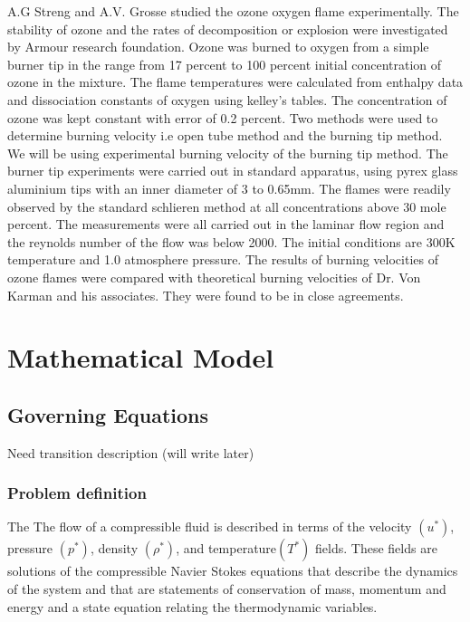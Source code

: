 \documentclass[10pt]{ubthesis}
\begin{document}
\bigskip
\noindent A.G Streng and A.V. Grosse \cite{Streng} studied the ozone oxygen flame experimentally. The stability of ozone and the rates of decomposition or explosion were investigated by Armour research foundation. Ozone was burned to oxygen from a simple burner tip in the range from 17 percent to 100 percent initial concentration of ozone in the mixture. The flame temperatures were calculated from enthalpy data and dissociation constants of oxygen using kelley's tables. The concentration of ozone was kept constant with error of   0.2 percent. Two methods were used to determine burning velocity i.e open tube method and the burning tip method. We will be using experimental burning velocity of the burning tip method. The burner tip experiments were carried out in standard apparatus, using pyrex glass aluminium tips with an inner diameter of 3 to 0.65mm. The flames were readily observed by the standard schlieren method at all concentrations above 30 mole percent. The measurements were all carried out in the laminar flow region and the reynolds number of the flow was below 2000. The initial conditions are 300K temperature and 1.0 atmosphere pressure. The results of burning velocities of ozone flames were compared with theoretical burning velocities of Dr. Von Karman and his associates. They were found to be in close agreements. 
\chapter{Mathematical Model}
\section{Governing Equations}
Need transition description (will write later)
\subsection{Problem definition}
The The flow of a compressible fluid is described in terms of the velocity $(u^*)$, pressure $(p^*)$, density $(\rho^*)$, and temperature$(T^*)$ fields. These fields are solutions of the compressible Navier Stokes equations that describe the dynamics of the system
and that are statements of conservation of mass, momentum and energy and a state equation relating the thermodynamic variables.  
\end{document}
